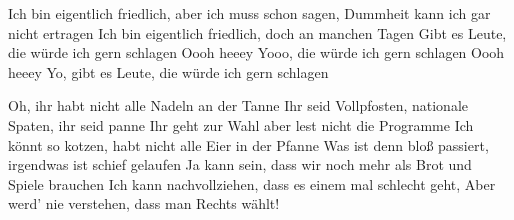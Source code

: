 \begin{guitar}
	Ich bin eigentlich friedlich, aber ich muss schon sagen,
	Dummheit kann ich gar nicht ertragen
	Ich bin eigentlich friedlich, doch an manchen Tagen
	Gibt es Leute, die würde ich gern schlagen
	Oooh heeey
	Yooo, die würde ich gern schlagen
	Oooh heeey 
	Yo, gibt es Leute, die würde ich gern schlagen
	
	Oh, ihr habt nicht alle Nadeln an der Tanne
	Ihr seid Vollpfosten, nationale Spaten, ihr seid panne
	Ihr geht zur Wahl aber lest nicht die Programme
	Ich könnt so kotzen, habt nicht alle Eier in der Pfanne
	Was ist denn bloß passiert, irgendwas ist schief gelaufen
	Ja kann sein, dass wir noch mehr als Brot und Spiele brauchen
	Ich kann nachvollziehen, dass es einem mal schlecht geht, 
	Aber werd' nie verstehen, dass man Rechts wählt!
	
	\begin{highlightbar}
		 
	\end{highlightbar}
\end{guitar}